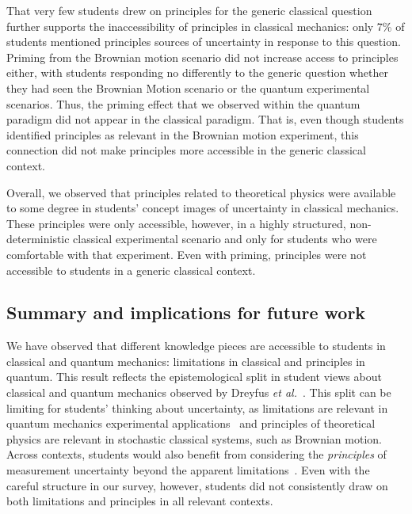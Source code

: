 \documentclass[english,aps,prstper,reprint,showpacs,longbibliography,superscriptaddress,nofootinbib]{revtex4-2}
\begin{document}
That very few students drew on principles for the generic classical question further supports the inaccessibility of principles in classical mechanics: only 7\% of students mentioned principles sources of uncertainty in response to this question. Priming from the Brownian motion scenario did not increase access to principles either, with students responding no differently to the generic question whether they had seen the Brownian Motion scenario or the quantum experimental scenarios. Thus, the priming effect that we observed within the quantum paradigm did not appear in the classical paradigm. That is, even though students identified  principles as relevant in the Brownian motion experiment, this connection did not make  principles more accessible in the generic classical context.

Overall, we observed that principles related to theoretical physics were available to some degree in students' concept images of uncertainty in classical mechanics. These principles were only accessible, however, in a highly structured, non-deterministic classical experimental scenario and only for students who were comfortable with that experiment. Even with priming, principles were not accessible to students in a generic classical context. %


\subsection{Summary and implications for future work}

We have observed that different knowledge pieces are accessible to students in classical and quantum mechanics: limitations in classical and principles in quantum. This result reflects the epistemological split in student views about classical and quantum mechanics observed by Dreyfus \textit{et al.}~\cite{Dreyfus2019}. This split can be limiting for students' thinking about uncertainty, as limitations are relevant in quantum mechanics experimental applications~\cite{Fox2020} and principles of theoretical physics are relevant in stochastic classical systems, such as Brownian motion. Across contexts, students would also benefit from considering the \emph{principles} of measurement uncertainty beyond the apparent limitations~\cite{Evangelinos1999,Evangelinos2002,Allie2003,Pillay2008,Buffler2008}. Even with the careful structure in our survey, however, students did not consistently draw on both limitations and  principles in all relevant contexts.
\end{document}
